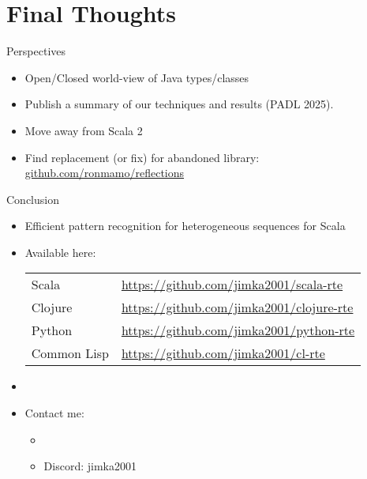 \section{Final Thoughts}


\begin{frame}{Perspectives}
  \begin{itemize}
  \item Open/Closed world-view of Java types/classes
  \item Publish a summary of our techniques and results (PADL 2025).
  \item Move away from Scala 2
  \item Find replacement (or fix) for abandoned library:   \url{github.com/ronmamo/reflections}
  \end{itemize}
\end{frame}

{
\begin{frame}{Conclusion}
  \begin{itemize}
  \item Efficient pattern recognition for heterogeneous sequences for Scala
  \item Available here:

    \bigskip
    
    \begin{tabular}{ll}
    Scala & \url{https://github.com/jimka2001/scala-rte}\\
    Clojure & \url{https://github.com/jimka2001/clojure-rte}\\
    Python & \url{https://github.com/jimka2001/python-rte}\\
    Common Lisp & \url{https://github.com/jimka2001/cl-rte}    
  \end{tabular}


    \bigskip
    
  \item {}

    \bigskip

  \item Contact me: 
    \begin{itemize}
    \item {}
    \item Discord: jimka2001
      
    \end{itemize}


  \end{itemize}
\end{frame}

}

